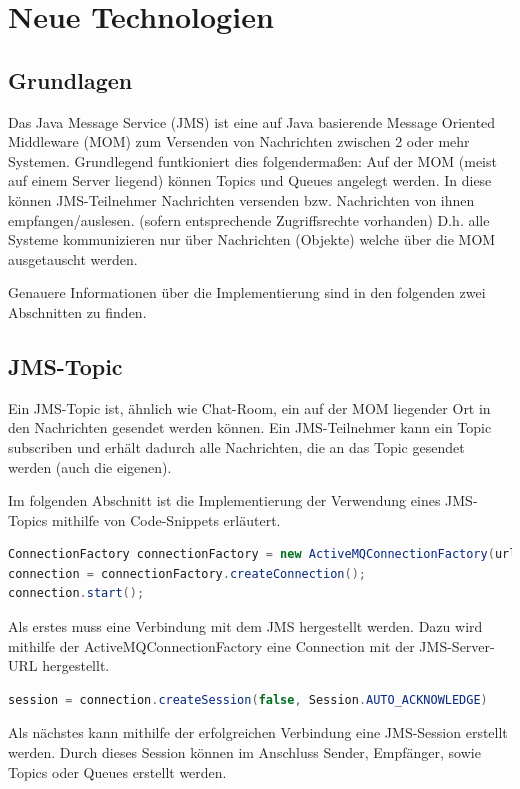 \documentclass[11pt, a4paper]{article}
\begin{document}
\newpage

\section{Neue Technologien}
\subsection{Grundlagen}
Das Java Message Service (JMS) ist eine auf Java basierende Message Oriented Middleware (MOM) zum Versenden von Nachrichten zwischen 2 oder mehr Systemen.
Grundlegend funtkioniert dies folgendermaßen:
Auf der MOM (meist auf einem Server liegend) können Topics und Queues angelegt werden.
In diese können JMS-Teilnehmer Nachrichten versenden bzw. Nachrichten von ihnen empfangen/auslesen. (sofern entsprechende Zugriffsrechte vorhanden)
D.h. alle Systeme kommunizieren nur über Nachrichten (Objekte) welche über die MOM ausgetauscht werden.

Genauere Informationen über die Implementierung sind in den folgenden zwei Abschnitten zu finden.

\subsection{JMS-Topic}
Ein JMS-Topic ist, ähnlich wie Chat-Room, ein auf der MOM liegender Ort in den Nachrichten gesendet werden können. Ein JMS-Teilnehmer kann ein Topic
subscriben und erhält dadurch alle Nachrichten, die an das Topic gesendet werden (auch die eigenen).

Im folgenden Abschnitt ist die Implementierung der Verwendung eines JMS-Topics mithilfe von Code-Snippets erläutert.

\begin{lstlisting}[language=Java]
ConnectionFactory connectionFactory = new ActiveMQConnectionFactory(url);
connection = connectionFactory.createConnection();
connection.start();
\end{lstlisting}

Als erstes muss eine Verbindung mit dem JMS hergestellt werden. Dazu wird mithilfe der ActiveMQConnectionFactory eine Connection mit der JMS-Server-URL
hergestellt.

\begin{lstlisting}[language=Java]
session = connection.createSession(false, Session.AUTO_ACKNOWLEDGE)
\end{lstlisting}

Als nächstes kann mithilfe der erfolgreichen Verbindung eine JMS-Session erstellt werden. Durch dieses Session können im Anschluss Sender, Empfänger, sowie
Topics oder Queues erstellt werden.
\end{document}
